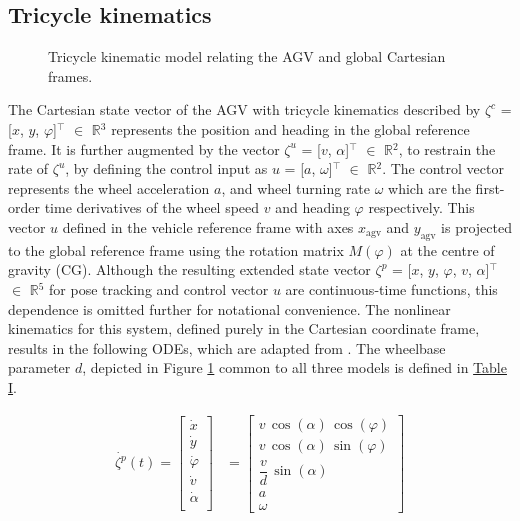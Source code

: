 \subsection{Tricycle kinematics}
\begin{figure}[htbp]
	\begin{center}
        \def\svgwidth{0.7\textwidth}
        
        \caption{Tricycle kinematic model relating the \ac{AGV} and global Cartesian frames.}
        \label{kin_tricycle}
	\end{center}
\end{figure}
\begin{sloppypar}
The Cartesian state vector of the AGV with tricycle kinematics described by $\zeta^{c}$ = [$x$, $y$, $\varphi$]$\mathrm{^{\top}}$ $\in$ $\mathbb{R}$$\mathrm{^{3}}$ represents the position and heading in the global reference frame. It is further augmented by the vector $\zeta^{u}$ = [$v$, $\alpha$]$\mathrm{^{\top}}$ $\in$ $\mathbb{R}$$\mathrm{^{2}}$, to restrain the rate of $\zeta^{u}$, by defining the control input as  $u$ = [$a$, $\omega$]$\mathrm{^{\top}}$ $\in$ $\mathbb{R}$$\mathrm{^{2}}$. The control vector represents the wheel acceleration $a$, and wheel turning rate $\omega$ which are the first-order time derivatives of the wheel speed $v$ and heading $\varphi$ respectively. This vector $u$ defined in the vehicle reference frame with axes $x_{\mathrm{agv}}$ and $y_{\mathrm{agv}}$ is projected to the global reference frame using the rotation matrix $M (\varphi)$ at the centre of gravity (CG). Although the resulting extended state vector $\zeta^{p}$ = [$x$, $y$, $\varphi$, $v$, $\alpha$]$\mathrm{^{\top}}$ $\in$ $\mathbb{R}$$\mathrm{^{5}}$ for pose tracking and control vector $u$ are continuous-time functions, this dependence is omitted further for notational convenience. The nonlinear kinematics for this system, defined purely in the Cartesian coordinate frame, results in the following \ac{ODE}s, which are adapted from \cite{ljubi_path_2023}. The wheelbase parameter $d$, depicted in Figure \ref{kin_tricycle} common to all three models is defined in \hyperref[table1]{Table I}.
\end{sloppypar}
\begin{align}
    \dot{\zeta^{p}}(t) = \begin{bmatrix}
        \dot{x}\\
        \dot{y}\\
        \dot{\varphi}\\
        \dot{v}\\
        \dot{\alpha}\\
    \end{bmatrix} & = 
    \begin{bmatrix}
        v\, \cos(\alpha)\, \cos(\varphi)\\
        v\, \cos(\alpha)\, \sin(\varphi)\\
        \dfrac{v}{d}\, \sin(\alpha)\\
        a\\
        \omega \label{eqZetaC}
    \end{bmatrix}
\end{align}
